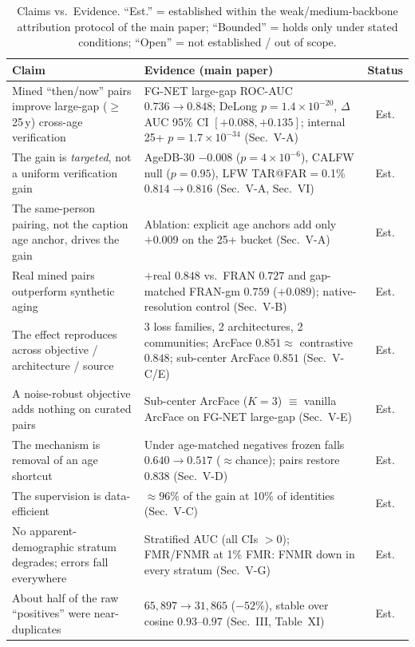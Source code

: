 \documentclass[journal]{IEEEtran}
\begin{document}
\begin{table}[!t]
\renewcommand{\arraystretch}{1.25}
\caption{Claims vs.\ Evidence. ``Est.'' = established within the weak/medium-backbone attribution
protocol of the main paper; ``Bounded'' = holds only under stated conditions; ``Open'' = not
established / out of scope.}
\label{tab:claims}
\centering
\footnotesize
\begin{tabular}{@{}p{}p{}c@{}}
\toprule
Claim & Evidence (main paper) & Status \\
\midrule
Mined ``then/now'' pairs improve large-gap ($\geq$25\,y) cross-age verification &
FG-NET large-gap ROC-AUC $0.736\!\to\!0.848$; DeLong $p{=}1.4{\times}10^{-20}$, $\Delta$AUC 95\% CI $[{+}0.088,{+}0.135]$; internal 25+ $p{=}1.7{\times}10^{-34}$ (Sec.~V-A) & Est. \\
The gain is \emph{targeted}, not a uniform verification gain &
AgeDB-30 $-0.008$ ($p{=}4{\times}10^{-6}$), CALFW null ($p{=}0.95$), LFW TAR@FAR$=$0.1\% $0.814\!\to\!0.816$ (Sec.~V-A, Sec.~VI) & Est. \\
The same-person pairing, not the caption age anchor, drives the gain &
Ablation: explicit age anchors add only $+0.009$ on the 25+ bucket (Sec.~V-A) & Est. \\
Real mined pairs outperform synthetic aging &
$+$real $0.848$ vs.\ FRAN $0.727$ and gap-matched FRAN-gm $0.759$ ($+0.089$); native-resolution control (Sec.~V-B) & Est. \\
The effect reproduces across objective / architecture / source &
3 loss families, 2 architectures, 2 communities; ArcFace $0.851\approx$ contrastive $0.848$; sub-center ArcFace $0.851$ (Sec.~V-C/E) & Est. \\
A noise-robust objective adds nothing on curated pairs &
Sub-center ArcFace ($K{=}3$) $\equiv$ vanilla ArcFace on FG-NET large-gap (Sec.~V-E) & Est. \\
The mechanism is removal of an age shortcut &
Under age-matched negatives frozen falls $0.640\!\to\!0.517$ ($\approx$chance); pairs restore $0.838$ (Sec.~V-D) & Est. \\
The supervision is data-efficient &
${\approx}96\%$ of the gain at 10\% of identities (Sec.~V-C) & Est. \\
No apparent-demographic stratum degrades; errors fall everywhere &
Stratified AUC (all CIs $>0$); FMR/FNMR at 1\% FMR: FNMR down in every stratum (Sec.~V-G) & Est. \\
About half of the raw ``positives'' were near-duplicates &
$65{,}897\!\to\!31{,}865$ ($-52\%$), stable over cosine $0.93$--$0.97$ (Sec.~III, Table~XI) & Est. \\

\end{tabular}
\end{table}
\end{document}
